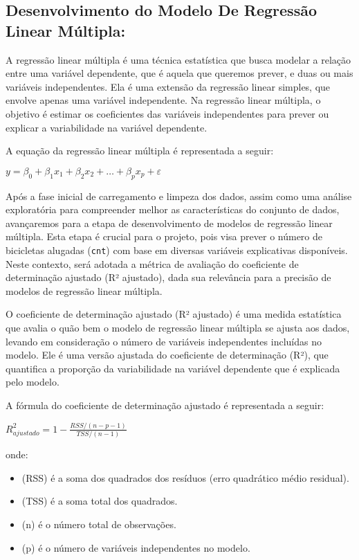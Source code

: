 \documentclass[
  letterpaper,
  DIV=11,
  numbers=noendperiod]{scrartcl}
\providecommand{\tightlist}{%
  \setlength{\itemsep}{0pt}\setlength{\parskip}{0pt}}\usepackage{longtable,booktabs,array}
\begin{document}
\subsection{Desenvolvimento do Modelo De Regressão Linear
Múltipla:}\label{desenvolvimento-do-modelo-de-regressuxe3o-linear-muxfaltipla}

A regressão linear múltipla é uma técnica estatística que busca modelar
a relação entre uma variável dependente, que é aquela que queremos
prever, e duas ou mais variáveis independentes. Ela é uma extensão da
regressão linear simples, que envolve apenas uma variável independente.
Na regressão linear múltipla, o objetivo é estimar os coeficientes das
variáveis independentes para prever ou explicar a variabilidade na
variável dependente.

A equação da regressão linear múltipla é representada a seguir:

\(y = \beta_0 + \beta_1 x_1 + \beta_2 x_2 + \ldots + \beta_p x_p + \varepsilon\)

Após a fase inicial de carregamento e limpeza dos dados, assim como uma
análise exploratória para compreender melhor as características do
conjunto de dados, avançaremos para a etapa de desenvolvimento de
modelos de regressão linear múltipla. Esta etapa é crucial para o
projeto, pois visa prever o número de bicicletas alugadas (\texttt{cnt})
com base em diversas variáveis explicativas disponíveis. Neste contexto,
será adotada a métrica de avaliação do coeficiente de determinação
ajustado (R² ajustado), dada sua relevância para a precisão de modelos
de regressão linear múltipla.

O coeficiente de determinação ajustado (R² ajustado) é uma medida
estatística que avalia o quão bem o modelo de regressão linear múltipla
se ajusta aos dados, levando em consideração o número de variáveis
independentes incluídas no modelo. Ele é uma versão ajustada do
coeficiente de determinação (R²), que quantifica a proporção da
variabilidade na variável dependente que é explicada pelo modelo.

A fórmula do coeficiente de determinação ajustado é representada a
seguir:

\(R^2_{ajustado} = 1 - \frac{RSS / (n - p - 1)}{TSS / (n - 1)}\)

onde:

\begin{itemize}
\tightlist
\item
  (RSS) é a soma dos quadrados dos resíduos (erro quadrático médio
  residual).
\item
  (TSS) é a soma total dos quadrados.
\item
  (n) é o número total de observações.
\item
  (p) é o número de variáveis independentes no modelo.
\end{itemize}
\end{document}
